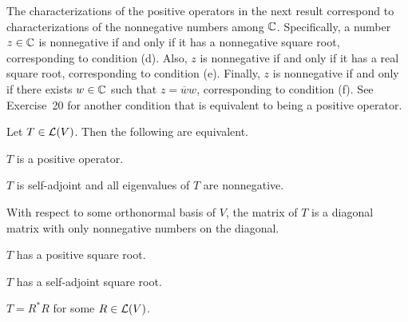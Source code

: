 %
The characterizations of the positive operators in the next result correspond
to characterizations of the nonnegative numbers among $\mathbb{C}$. Specifically, a
number $z\in\mathbb{C}$ is nonnegative if and only if it has a nonnegative square root,
corresponding to condition (d). Also, $z$ is nonnegative if and only if it has a
real square root, corresponding to condition (e). Finally, $z$ is nonnegative if
and only if there exists $w\in\mathbb{C}$ such that $z=\overline{w}w$, corresponding to
condition (f). See Exercise~20 for another condition that is equivalent to
being a positive operator.

\begin{result}\label{ax:7.38}
Let $T\in\mathcal{L}(V)$. Then the following are equivalent.
\begin{parts}
\item $T$ is a positive operator.
\item $T$ is self-adjoint and all eigenvalues of $T$ are nonnegative.
\item With respect to some orthonormal basis of $V$, the matrix of $T$ is a
  diagonal matrix with only nonnegative numbers on the diagonal.
\item $T$ has a positive square root.
\item $T$ has a self-adjoint square root.
\item $T=R^*R$ for some $R\in\mathcal{L}(V)$.
\end{parts}
\end{result}

